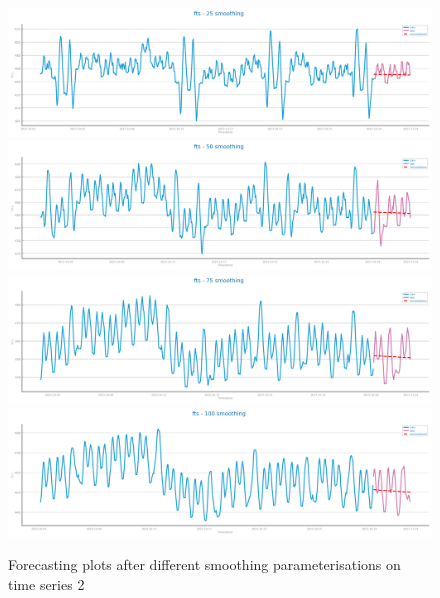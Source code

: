 \documentclass[10pt]{extarticle}
\begin{document}
\begin{figure}[H]
\centering\includegraphics[scale=0.4]{images/dataset2/time_series/fts_forecast_ts_after_smooth_ws_25.png}
\includegraphics[scale=0.4]{images/dataset2/time_series/fts_forecast_ts_after_smooth_ws_50.png}
\includegraphics[scale=0.4]{images/dataset2/time_series/fts_forecast_ts_after_smooth_ws_75.png}
\includegraphics[scale=0.4]{images/dataset2/time_series/fts_forecast_ts_after_smooth_ws_100.png}
\caption{Forecasting plots after different smoothing parameterisations on time series 2}
\end{figure}
\end{document}
